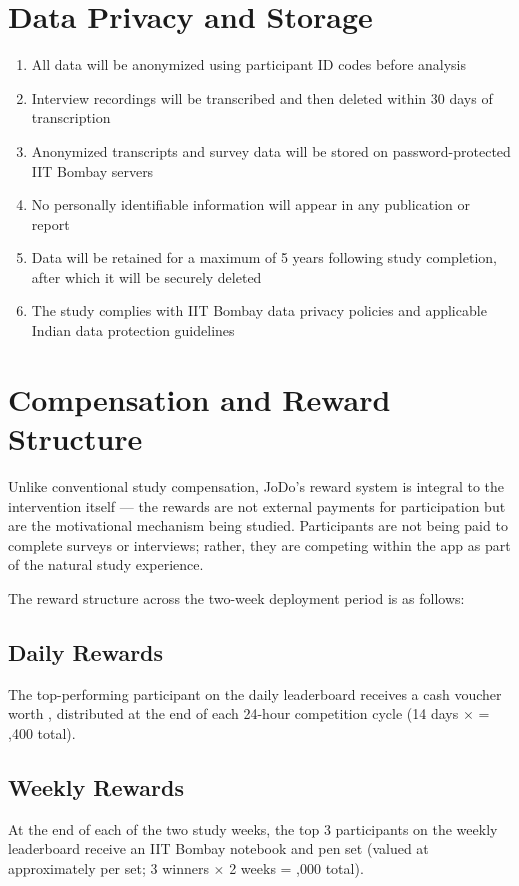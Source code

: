 \documentclass[12pt,a4paper]{article}
\newcommand{\rupee}{\textrupee}
\begin{document}
\section{Data Privacy and Storage}
\begin{enumerate}
    \item All data will be anonymized using participant ID codes before analysis
    \item Interview recordings will be transcribed and then deleted within 30 days of transcription
    \item Anonymized transcripts and survey data will be stored on password-protected IIT Bombay servers
    \item No personally identifiable information will appear in any publication or report
    \item Data will be retained for a maximum of 5 years following study completion, after which it will be securely deleted
    \item The study complies with IIT Bombay data privacy policies and applicable Indian data protection guidelines
\end{enumerate}
\section{Compensation and Reward Structure}

Unlike conventional study compensation, JoDo's reward system is integral 
to the intervention itself --- the rewards are not external payments for 
participation but are the motivational mechanism being studied. 
Participants are not being paid to complete surveys or interviews; rather, 
they are competing within the app as part of the natural study experience.

The reward structure across the two-week deployment period is as follows:

\subsection*{Daily Rewards}
The top-performing participant on the daily leaderboard receives a cash 
voucher worth \rupee100, distributed at the end of each 24-hour competition 
cycle (14 days $\times$ \rupee100 = \rupee1,400 total).

\subsection*{Weekly Rewards}
At the end of each of the two study weeks, the top 3 participants on the 
weekly leaderboard receive an IIT Bombay notebook and pen set (valued at 
approximately \rupee500 per set; 3 winners $\times$ 2 weeks = \rupee3,000 total).
\end{document}
